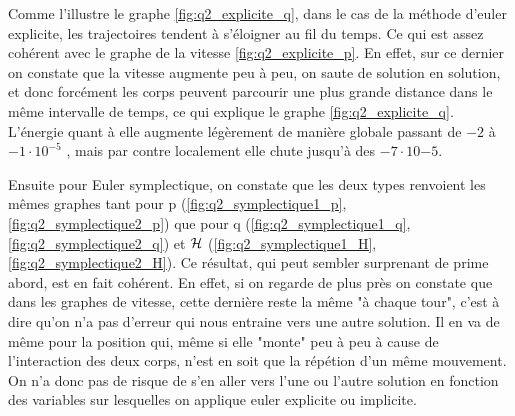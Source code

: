 	Comme l'illustre le graphe \ref{fig:q2_explicite_q}, dans le cas de la méthode d'euler explicite, les trajectoires tendent à s'éloigner au fil du temps. Ce qui est assez cohérent avec le graphe de la vitesse \ref{fig:q2_explicite_p}. En effet, sur ce dernier on constate que la vitesse augmente peu à peu, on saute de solution en solution, et donc forcément les corps peuvent parcourir une plus grande distance dans le même intervalle de temps, ce qui explique le graphe \ref{fig:q2_explicite_q}. L'énergie quant à elle augmente légèrement de manière globale  passant de $-2$ à $-1 \cdot 10^{-5}$ , mais par contre localement elle chute jusqu'à des $-7 \cdot 10{-5}$. 
	
	Ensuite pour Euler symplectique, on constate que les deux types renvoient les mêmes graphes tant pour p (\ref{fig:q2_symplectique1_p}, \ref{fig:q2_symplectique2_p}) que pour q (\ref{fig:q2_symplectique1_q}, \ref{fig:q2_symplectique2_q})  et $\mathcal{H}$ (\ref{fig:q2_symplectique1_H}, \ref{fig:q2_symplectique2_H}). Ce résultat, qui peut sembler surprenant de prime abord, est en fait cohérent. En effet, si on regarde de plus près on constate que dans les graphes de vitesse, cette dernière reste la même "à chaque tour", c'est à dire qu'on n'a pas d'erreur qui nous entraine vers une autre solution. Il en va de même pour la position qui, même si elle "monte" peu à peu à cause de l'interaction des deux corps, n'est en soit que la répétion d'un même mouvement. On n'a donc pas de risque de s'en aller vers l'une ou l'autre solution en fonction des variables sur lesquelles on applique euler explicite ou implicite.    



